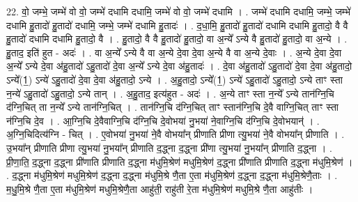 \documentclass[17pt]{extarticle}
\begin{document}
22. वो॒ जम्भे॒ जम्भे॑ वो वो॒ जम्भे॑ दधामि दधामि॒ जम्भे॑ वो वो॒ जम्भे॑ दधामि । . जम्भे॑ दधामि दधामि॒ जम्भे॒ जम्भे॑ दधामि हु॒तादो॑ हु॒तादो॑ दधामि॒ जम्भे॒ जम्भे॑ दधामि हु॒तादः॑ । . द॒धा॒मि॒ हु॒तादो॑ हु॒तादो॑ दधामि दधामि हु॒तादो॒ वै वै हु॒तादो॑ दधामि दधामि हु॒तादो॒ वै । . हु॒तादो॒ वै वै हु॒तादो॑ हु॒तादो॒ वा अ॒न्ये᳚ ऽन्ये वै हु॒तादो॑ हु॒तादो॒ वा अ॒न्ये । . हु॒ताद॒ इति॑ हुत - अदः॑ । . वा अ॒न्ये᳚ ऽन्ये वै वा अ॒न्ये दे॒वा दे॒वा अ॒न्ये वै वा अ॒न्ये दे॒वाः । . अ॒न्ये दे॒वा दे॒वा अ॒न्ये᳚ ऽन्ये दे॒वा अ॑हु॒तादो॑ ऽहु॒तादो॑ दे॒वा अ॒न्ये᳚ ऽन्ये दे॒वा अ॑हु॒तादः॑ । . दे॒वा अ॑हु॒तादो॑ ऽहु॒तादो॑ दे॒वा दे॒वा अ॑हु॒तादो॒ ऽन्ये᳚(1॒) ऽन्ये॑ ऽहु॒तादो॑ दे॒वा दे॒वा अ॑हु॒तादो॒ ऽन्ये । . अ॒हु॒तादो॒ ऽन्ये᳚(1॒) ऽन्ये॑ ऽहु॒तादो॑ ऽहु॒तादो॒ ऽन्ये ताꣳ स्ता न॒न्ये॑ ऽहु॒तादो॑ ऽहु॒तादो॒ ऽन्ये तान् । . अ॒हु॒ताद॒ इत्य॑हुत - अदः॑ । . अ॒न्ये ताꣳ स्ता न॒न्ये᳚ ऽन्ये तान॑ग्नि॒चि द॑ग्नि॒चित् ता न॒न्ये᳚ ऽन्ये तान॑ग्नि॒चित् । . तान॑ग्नि॒चि द॑ग्नि॒चित् ताꣳ स्तान॑ग्नि॒चि दे॒वै वाग्नि॒चित् ताꣳ स्ता न॑ग्नि॒चि दे॒व । . आ॒ग्नि॒चि दे॒वैवाग्नि॒चि द॑ग्नि॒चि दे॒वोभया॑ नु॒भया॑ ने॒वाग्नि॒चि द॑ग्नि॒चि दे॒वोभयान्॑ । . अ॒ग्नि॒चिदित्य॑ग्नि - चित् । . ए॒वोभया॑ नु॒भया॑ ने॒वै वोभया᳚न् प्रीणाति प्रीणा त्यु॒भया॑ ने॒वै वोभया᳚न् प्रीणाति । . उ॒भया᳚न् प्रीणाति प्रीणा त्यु॒भया॑ नु॒भया᳚न् प्रीणाति द॒द्ध्ना द॒द्ध्ना प्री॑णा त्यु॒भया॑ नु॒भया᳚न् प्रीणाति द॒द्ध्ना । . प्री॒णा॒ति॒ द॒द्ध्ना द॒द्ध्ना प्री॑णाति प्रीणाति द॒द्ध्ना म॑धुमि॒श्रेण॑ मधुमि॒श्रेण॑ द॒द्ध्ना प्री॑णाति प्रीणाति द॒द्ध्ना म॑धुमि॒श्रेण॑ । . द॒द्ध्ना म॑धुमि॒श्रेण॑ मधुमि॒श्रेण॑ द॒द्ध्ना द॒द्ध्ना म॑धुमि॒श्रे णै॒ता ए॒ता म॑धुमि॒श्रेण॑ द॒द्ध्ना द॒द्ध्ना म॑धुमि॒श्रेणै॒ताः । . म॒धु॒मि॒श्रे णै॒ता ए॒ता म॑धुमि॒श्रेण॑ मधुमि॒श्रेणै॒ता आहु॑ती॒ राहु॑ती रे॒ता म॑धुमि॒श्रेण॑ मधुमि॒श्रे णै॒ता आहु॑तीः । \newline
\end{document}

